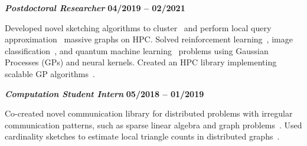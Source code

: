 \begin{outerlist}
  \vspace{-0.5em}

  \item[] \textbf{\textit{Postdoctoral Researcher}}%
  \hfill \textbf{04/2019 -- 02/2021}

  \vspace{-0.5em}

  Developed novel sketching algorithms to cluster~\cite{priest2020scaling} and
  perform local query approximation~\cite{priest2020degreesketch} massive graphs
  on HPC.
  Solved reinforcement learning~\cite{goumiri2020reinforcement}, image
  classification~\cite{goumiri2020star}, and quantum machine learning~\cite{otten2020quantum} problems using Gaussian Processes (GPs) and neural
  kernels.
  Created an HPC library implementing scalable GP algorithms~\cite{muygpys}.

  \vspace{-0.5em}

  \item[] \textbf{\textit{Computation Student Intern}}%
  \hfill \textbf{05/2018 -- 01/2019}

  \vspace{-0.5em}

  Co-created novel communication library for distributed problems with irregular
  communication patterns, such as sparse linear algebra and graph
  problems~\cite{priest2019you, ygm}.
  Used cardinality sketches to estimate local triangle counts in distributed
  graphs~\cite{priest2018estimating}.

\end{outerlist}
